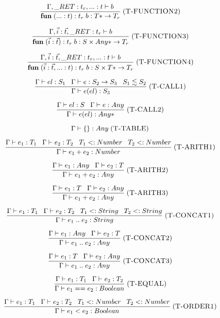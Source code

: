 \documentclass[12pt]{article}
\newcommand{\mylabel}[1]{\; (\textsc{#1})}
\newcommand{\subtype}{<:}
\newcommand{\kw}[1]{\mathbf{#1} \;}
\newcommand{\env}{\Gamma}
\newcommand{\ret}{\string_RET}
\begin{document}
\[
\frac{\env, \ret:t_{r}, {...}:t \vdash b}
     {\kw{fun} ({...}:t):t_{r} \; b : {T*} \rightarrow T_{r}}
\mylabel{T-FUNCTION2}
\]

\[
\frac{\env, \vec{i}:\vec{t}, \ret:t_{r} \vdash b}
     {\kw{fun} (\vec{i}:\vec{t}):t_{r} \; b :
      S \times {Any*} \rightarrow T_{r}}
\mylabel{T-FUNCTION3}
\]

\[
\frac{\env, \vec{i}:\vec{t}, \ret:t_{r}, {...}:t \vdash b}
     {\kw{fun} (\vec{i}:\vec{t}, {...}:t):t_{r} \; b :
      S \times {T*} \rightarrow T_{r}}
\mylabel{T-FUNCTION4}
\]

\[
\frac{\env \vdash el:S_{1} \;\;\;
      \env \vdash e:S_{2} \rightarrow S_{3} \;\;\;
      S_{1} \lesssim S_{2}}
     {\env \vdash e(el) : S_{3}}
\mylabel{T-CALL1}
\]

\[
\frac{\env \vdash el:S \;\;\;
      \env \vdash e:Any}
     {\env \vdash e(el) : {Any*}}
\mylabel{T-CALL2}
\]

\[
\env \vdash \{\} : Any
\mylabel{T-TABLE}
\]

\[
\frac{\env \vdash e_{1}:T_{1} \;\;\;
      \env \vdash e_{2}:T_{2} \;\;\;
      T_{1} \subtype Number \;\;\;
      T_{2} \subtype Number}
     {\env \vdash e_{1} + e_{2} : Number}
\mylabel{T-ARITH1}
\]

\[
\frac{\env \vdash e_{1}:Any \;\;\;
      \env \vdash e_{2}:T}
     {\env \vdash e_{1} + e_{2} : Any}
\mylabel{T-ARITH2}
\]

\[
\frac{\env \vdash e_{1}:T \;\;\;
      \env \vdash e_{2}:Any}
     {\env \vdash e_{1} + e_{2} : Any}
\mylabel{T-ARITH3}
\]

\[
\frac{\env \vdash e_{1}:T_{1} \;\;\;
      \env \vdash e_{2}:T_{2} \;\;\;
      T_{1} \subtype String \;\;\;
      T_{2} \subtype String}
     {\env \vdash e_{1} \; {..} \;  e_{2} : String}
\mylabel{T-CONCAT1}
\]

\[
\frac{\env \vdash e_{1}:Any \;\;\;
      \env \vdash e_{2}:T}
     {\env \vdash e_{1} \; {..} \; e_{2} : Any}
\mylabel{T-CONCAT2}
\]

\[
\frac{\env \vdash e_{1}:T \;\;\;
      \env \vdash e_{2}:Any}
     {\env \vdash e_{1} \; {..} \; e_{2} : Any}
\mylabel{T-CONCAT3}
\]

\[
\frac{\env \vdash e_{1}:T_{1} \;\;\;
      \env \vdash e_{2}:T_{2}}
     {\env \vdash e_{1} == e_{2} : Boolean}
\mylabel{T-EQUAL}
\]

\[
\frac{\env \vdash e_{1}:T_{1} \;\;\;
      \env \vdash e_{2}:T_{2} \;\;\;
      T_{1} \subtype Number \;\;\;
      T_{2} \subtype Number}
     {\env \vdash e_{1} < e_{2} : Boolean}
\mylabel{T-ORDER1}
\]
\end{document}
